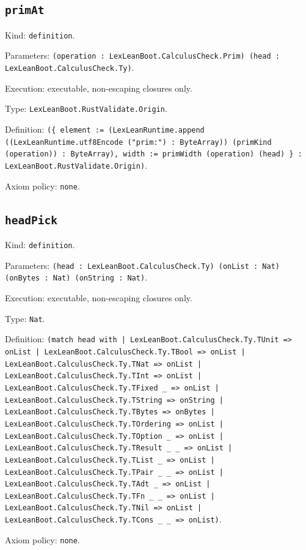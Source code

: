 \documentclass[11pt]{article}
\begin{document}
\subsection*{\texttt{primAt}}
\noindent Kind: \texttt{definition}.\par
\noindent Parameters: \texttt{(operation : LexLeanBoot.CalculusCheck.Prim) (head : LexLeanBoot.CalculusCheck.Ty)}.\par
\noindent Execution: executable, non-escaping closures only.\par
\noindent Type: \texttt{LexLeanBoot.RustValidate.Origin}.\par
\noindent Definition: \texttt{(\{ element := (LexLeanRuntime.append ((LexLeanRuntime.utf8Encode ("prim:") : ByteArray)) (primKind (operation)) : ByteArray), width := primWidth (operation) (head) \} : LexLeanBoot.RustValidate.Origin)}.\par
\noindent Axiom policy: \texttt{none}.\par
\subsection*{\texttt{headPick}}
\noindent Kind: \texttt{definition}.\par
\noindent Parameters: \texttt{(head : LexLeanBoot.CalculusCheck.Ty) (onList : Nat) (onBytes : Nat) (onString : Nat)}.\par
\noindent Execution: executable, non-escaping closures only.\par
\noindent Type: \texttt{Nat}.\par
\noindent Definition: \texttt{(match head with | LexLeanBoot.CalculusCheck.Ty.TUnit => onList | LexLeanBoot.CalculusCheck.Ty.TBool => onList | LexLeanBoot.CalculusCheck.Ty.TNat => onList | LexLeanBoot.CalculusCheck.Ty.TInt => onList | LexLeanBoot.CalculusCheck.Ty.TFixed \_ => onList | LexLeanBoot.CalculusCheck.Ty.TString => onString | LexLeanBoot.CalculusCheck.Ty.TBytes => onBytes | LexLeanBoot.CalculusCheck.Ty.TOrdering => onList | LexLeanBoot.CalculusCheck.Ty.TOption \_ => onList | LexLeanBoot.CalculusCheck.Ty.TResult \_ \_ => onList | LexLeanBoot.CalculusCheck.Ty.TList \_ => onList | LexLeanBoot.CalculusCheck.Ty.TPair \_ \_ => onList | LexLeanBoot.CalculusCheck.Ty.TAdt \_ => onList | LexLeanBoot.CalculusCheck.Ty.TFn \_ \_ => onList | LexLeanBoot.CalculusCheck.Ty.TNil => onList | LexLeanBoot.CalculusCheck.Ty.TCons \_ \_ => onList)}.\par
\noindent Axiom policy: \texttt{none}.\par
\end{document}
